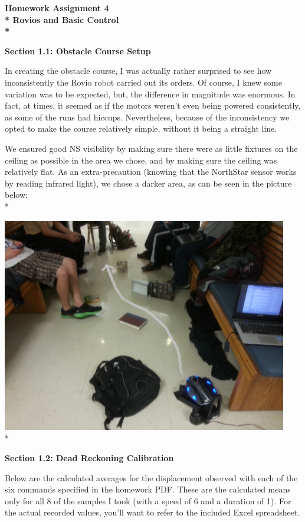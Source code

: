 \documentclass{article}
\begin{document}
{\centering
\huge
\bf
Homework Assignment 4\\*
\rm
\centering
Rovios and Basic Control\\*
}

\vspace{8mm}

\bf Section 1.1: Obstacle Course Setup \rm

In creating the obstacle course, I was actually rather surprised to see how inconsistently the Rovio robot carried out its orders. Of course, I knew some variation was to be expected, but, the difference in magnitude was enormous. In fact, at times, it seemed as if the motors weren't even being powered consistently, as some of the runs had hiccups. Nevertheless, because of the inconsistency we opted to make the course relatively simple, without it being a straight line.

We ensured good NS visibility by making sure there were as little fixtures on the ceiling as possible in the area we chose, and by making sure the ceiling was relatively flat. As an extra-precaution (knowing that the NorthStar sensor works by reading infrared light), we chose a darker area, as can be seen in the picture below: \\*


{
\centering
\includegraphics[width=12.5cm]{course.jpg} \\*
}

\vspace{8mm}
\bf Section 1.2: Dead Reckoning Calibration \rm
\vspace{4mm}

Below are the calculated averages for the displacement observed with each of the six commands specified in the homework PDF. These are the calculated means only for all 8 of the samples I took (with a speed of 6 and a duration of 1). For the actual recorded values, you'll want to refer to the included Excel spreadsheet.
\end{document}
